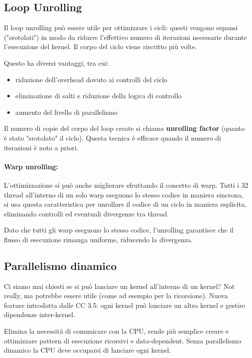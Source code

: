 \subsection{Loop Unrolling}
Il loop unrolling può essere utile per ottimizzare i cicli: questi vengono espansi ("srotolati") in modo da ridurre l'effettivo numero di iterazioni necessarie durante l'esecuzione del kernel. Il corpo del ciclo viene riscritto più volte. 

Questo ha diversi vantaggi, tra cui: 
\begin{itemize}
	\item riduzione dell'overhead dovuto ai controlli del ciclo
	
	\item eliminazione di salti e riduzione della logica di controllo 
	
	\item aumento del livello di parallelismo
\end{itemize}

Il numero di copie del corpo del loop create si chiama \textbf{unrolling factor} (quanto è stato "srotolato" il ciclo). Questa tecnica è efficace quando il numero di iterazioni è noto a priori.

\paragraph{Warp unrolling:} L'ottimizzazione si può anche migliorare sfruttando il concetto di warp. Tutti i 32 thread all'interno di un solo warp eseguono lo stesso codice in maniera sincrona, si usa questa caratteristica per unrollare il codice di un ciclo in maniera esplicita, eliminando controlli ed eventuali divergenze tra thread. 

Dato che tutti gli warp eseguono lo stesso codice, l'unrolling garantisce che il flusso di esecuzione rimanga uniforme, riducendo la divergenza. 


\subsection{Parallelismo dinamico}

Ci siamo mai chiesti se si può lanciare un kernel all'interno di un kernel? Not really, ma potrebbe essere utile (come ad esempio per la ricorsione). Nuova feature introdotta dalle CC 3.5: ogni kernel può lanciare un altro kernel e gestire dipendenze inter-kernel. 

Elimina la necessità di comunicare con la CPU, rende più semplice creare e ottimizzare pattern di esecuzione ricorsivi e data-dependent. Senza parallelismo dinamico la CPU deve occuparsi di lanciare ogni kernel.

